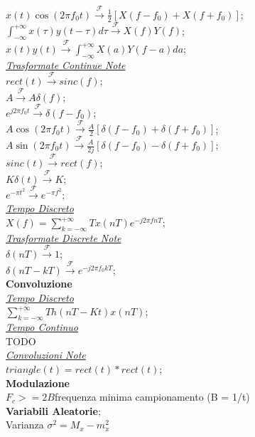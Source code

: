 \documentclass[a4paper]{article}
\begin{document}
\begin{multicols*}{3}
$x(t)\cos(2{\pi}{f_0}t) \xrightarrow{\mathscr{F}} \frac{1}{2}[X(f - f_0) + X(f + f_0)]$; \\
$\int_{-\infty}^{+\infty}x(\tau)y(t - \tau) d\tau \xrightarrow{\mathscr{F}} X(f)Y(f)$; \\
$x(t)y(t) \xrightarrow{\mathscr{F}} \int_{-\infty}^{+\infty}X(a)Y(f - a) da$; \\
\underline{\textit{Trasformate Continue Note}} \\
$rect(t) \xrightarrow{\mathscr{F}} sinc(f)$; \\
$A \xrightarrow{\mathscr{F}} A\delta (f)$; \\
$e^{j2{\pi}f_{0}t} \xrightarrow{\mathscr{F}} \delta (f-f_0)$; \\
$A\cos(2{\pi}f_{0}t) \xrightarrow{\mathscr{F}} {\frac{A}{2}}[\delta(f-f_0) + \delta(f+f_0)]$; \\
$A\sin(2{\pi}f_{0}t) \xrightarrow{\mathscr{F}} {\frac{A}{2j}}[\delta(f-f_0) - \delta(f+f_0)]$; \\
$sinc(t) \xrightarrow{\mathscr{F}} rect(f)$; \\
$K\delta(t) \xrightarrow{\mathscr{F}} K$; \\
$e^{-\pi{t^2}} \xrightarrow{\mathscr{F}} e^{-\pi{f^2}}$; \\
\underline{\textit{Tempo Discreto}} \\
$X(f) = \sum_{k=-\infty}^{+\infty}{Tx(nT)e^{-j2\pi fnT}}$; \\
\underline{\textit{Trasformate Discrete Note}} \\
$\delta(nT) \xrightarrow{\mathscr{F}} 1$; \\
$\delta(nT - kT) \xrightarrow{\mathscr{F}} e^{-j2{\pi}{f_0}kT}$; \\
\textbf{Convoluzione} \\
\underline{\textit{Tempo Discreto}} \\
$\sum_{k=-\infty}^{+\infty}{Th(nT-Kt)x(nT)}$; \\
\underline{\textit{Tempo Continuo}} \\
TODO \\ 
\underline{\textit{Convoluzioni Note}} \\
$triangle(t) = rect(t) * rect(t)$; \\
\textbf{Modulazione} \\
$F_c>=2B$frequenza minima campionamento (B = 1/t)\\
\textbf{Variabili Aleatorie}; \\
Varianza $\sigma^2=M_x-m_x^2$ \\

\end{multicols*}
\end{document}
